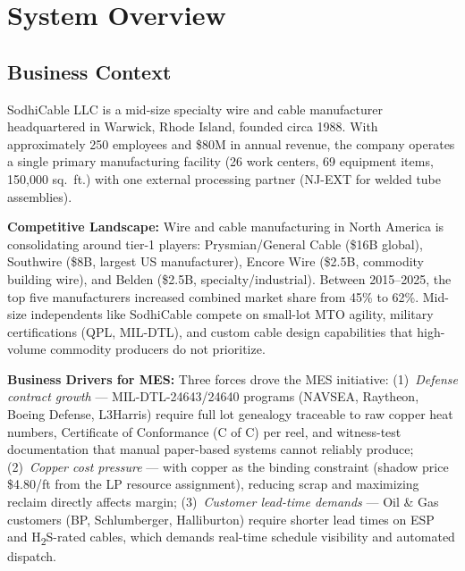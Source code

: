 \documentclass[11pt]{article}
\begin{document}
\section{System Overview}\label{sec:overview}

\subsection{Business Context}

SodhiCable LLC is a mid-size specialty wire and cable manufacturer headquartered in Warwick, Rhode Island, founded circa 1988. With approximately 250 employees and \$80M in annual revenue, the company operates a single primary manufacturing facility (26 work centers, 69 equipment items, 150{,}000 sq.\ ft.) with one external processing partner (NJ-EXT for welded tube assemblies).

\textbf{Competitive Landscape:} Wire and cable manufacturing in North America is consolidating around tier-1 players: Prysmian/General Cable (\$16B global), Southwire (\$8B, largest US manufacturer), Encore Wire (\$2.5B, commodity building wire), and Belden (\$2.5B, specialty/industrial). Between 2015--2025, the top five manufacturers increased combined market share from 45\% to 62\%. Mid-size independents like SodhiCable compete on small-lot MTO agility, military certifications (QPL, MIL-DTL), and custom cable design capabilities that high-volume commodity producers do not prioritize.

\textbf{Business Drivers for MES:} Three forces drove the MES initiative: (1)~\textit{Defense contract growth} --- MIL-DTL-24643/24640 programs (NAVSEA, Raytheon, Boeing Defense, L3Harris) require full lot genealogy traceable to raw copper heat numbers, Certificate of Conformance (C of C) per reel, and witness-test documentation that manual paper-based systems cannot reliably produce; (2)~\textit{Copper cost pressure} --- with copper as the binding constraint (shadow price \$4.80/ft from the LP resource assignment), reducing scrap and maximizing reclaim directly affects margin; (3)~\textit{Customer lead-time demands} --- Oil \& Gas customers (BP, Schlumberger, Halliburton) require shorter lead times on ESP and H\textsubscript{2}S-rated cables, which demands real-time schedule visibility and automated dispatch.
\end{document}
